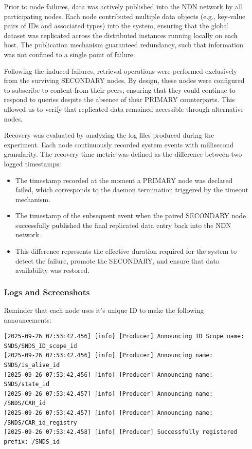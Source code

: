 \documentclass{article}
\begin{document}
Prior to node failures, data was actively published into the NDN network by all participating nodes. Each node contributed multiple data objects (e.g., key-value pairs of IDs and associated types) into the system, ensuring that the global dataset was replicated across the distributed instances running locally on each host. The publication mechanism guaranteed redundancy, such that information was not confined to a single point of failure.

Following the induced failures, retrieval operations were performed exclusively from the surviving SECONDARY nodes. By design, these nodes were configured to subscribe to content from their peers, ensuring that they could continue to respond to queries despite the absence of their PRIMARY counterparts. This allowed us to verify that replicated data remained accessible through alternative nodes.

Recovery was evaluated by analyzing the log files produced during the experiment. Each node continuously recorded system events with millisecond granularity. The recovery time metric was defined as the difference between two logged timestamps:

\begin{itemize}
    \item The timestamp recorded at the moment a PRIMARY node was declared failed, which corresponds to the daemon termination triggered by the timeout mechanism.
    \item The timestamp of the subsequent event when the paired SECONDARY node successfully published the final replicated data entry back into the NDN network.
    \item This difference represents the effective duration required for the system to detect the failure, promote the SECONDARY, and ensure that data availability was restored.
\end{itemize}

\subsubsection{Logs and Screenshots}

Reminder that each node uses it's unique ID to make the following announcements:
\begin{lstlisting}[language=log,caption={Local announcements for each Node},label={lst:announcements-for-each-node}]
[2025-09-26 07:53:42.456] [info] [Producer] Announcing ID Scope name: SNDS/SNDS_ID_scope_id
[2025-09-26 07:53:42.456] [info] [Producer] Announcing name: SNDS/is_alive_id
[2025-09-26 07:53:42.456] [info] [Producer] Announcing name: SNDS/state_id
[2025-09-26 07:53:42.457] [info] [Producer] Announcing name: /SNDS/CAR_id
[2025-09-26 07:53:42.457] [info] [Producer] Announcing name: /SNDS/CAR_id_registry
[2025-09-26 07:53:42.458] [info] [Producer] Successfully registered prefix: /SNDS_id  

\end{lstlisting}
\end{document}
